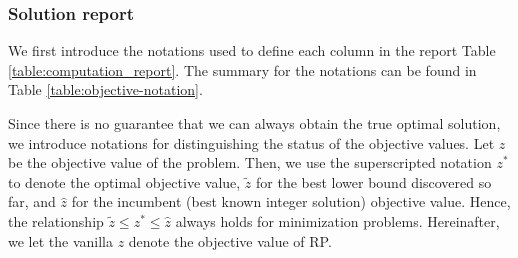 
\subsubsection{Solution report} \label{subsec:sol_report}
We first introduce the notations used to define each column in the report Table \ref{table:computation_report}. The summary for the notations can be found in Table \ref{table:objective-notation}.

Since there is no guarantee that we can always obtain the true optimal solution, we introduce notations for distinguishing the status of the objective values. Let $z$ be the objective value of the problem. Then, we use the superscripted notation $z^*$ to denote the optimal objective value, $\tilde{z}$ for the best lower bound discovered so far, and $\hat{z}$ for the incumbent (best known integer solution) objective value. Hence, the relationship $\tilde{z}\le z^*\le\hat{z}$ always holds for minimization problems. Hereinafter, we let the vanilla $z$ denote the objective value of RP. 



